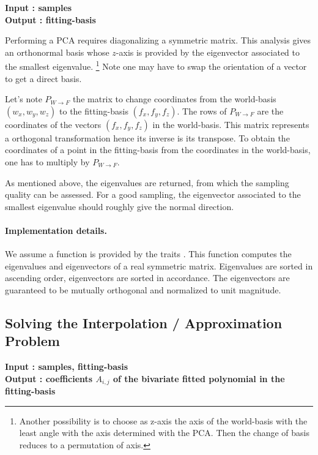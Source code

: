 {\bf Input : samples\\ Output : fitting-basis}


%
%
Performing a PCA requires diagonalizing a symmetric matrix.  This
analysis gives an orthonormal basis whose $z$-axis is provided by the
eigenvector associated to the smallest eigenvalue.
\footnote{Another possibility is to choose as z-axis the axis of the
world-basis with the least angle with the axis determined with the
PCA. Then the change of basis reduces to a permutation of axis.} Note
one may have to swap the orientation of a vector to get a direct
basis.

Let's note $P_{W\rightarrow F}$ the matrix to change coordinates from the
world-basis $(w_x,w_y,w_z)$ to the fitting-basis $(f_x,f_y,f_z)$. The
rows of $P_{W\rightarrow F}$ are the coordinates of the vectors
$(f_x,f_y,f_z)$ in the world-basis. This matrix represents a
orthogonal transformation hence its inverse is its transpose. To obtain
the coordinates of a point in the fitting-basis from the coordinates
in the world-basis, one has to multiply by $ P_{W\rightarrow F}$.

As mentioned above, the eigenvalues are returned, from which the
sampling quality can be assessed. For a good sampling, the eigenvector
associated to the smallest eigenvalue should roughly give the normal
direction.


\paragraph{Implementation details.}
We assume a  function is provided by the traits
.
This function computes the eigenvalues and eigenvectors of a real
symmetric matrix. Eigenvalues are sorted in ascending order,
eigenvectors are sorted in accordance.  The eigenvectors are
guaranteed to be mutually orthogonal and normalized to unit magnitude.

\subsection{Solving the Interpolation / Approximation Problem}
\label{sec:solving}

{\bf Input : samples, fitting-basis \\ Output : coefficients $A_{i,j}$ of the
bivariate fitted polynomial in the fitting-basis }

